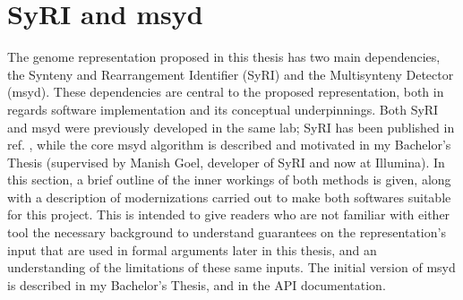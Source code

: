 \section*{SyRI and msyd}

The genome representation proposed in this thesis has two main dependencies, the Synteny and Rearrangement Identifier (SyRI) and the Multisynteny Detector (msyd).
These dependencies are central to the proposed representation, both in regards software implementation and its conceptual underpinnings.
Both SyRI and msyd were previously developed in the same lab; SyRI has been published in ref. \cite{goel19}, while the core msyd algorithm is described and motivated in my Bachelor's Thesis (supervised by Manish Goel, developer of SyRI and now at Illumina).
In this section, a brief outline of the inner workings of both methods is given, along with a description of modernizations carried out to make both softwares suitable for this project. %
This is intended to give readers who are not familiar with either tool the necessary background to understand guarantees on the representation's input that are used in formal arguments later in this thesis, and an understanding of the limitations of these same inputs.
The initial version of msyd is described in my Bachelor's Thesis, and in the API documentation.


